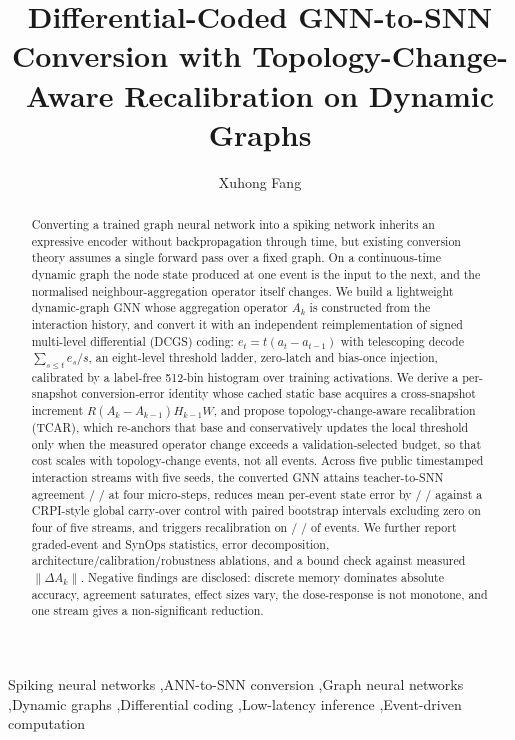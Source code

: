 \documentclass[preprint,12pt]{elsarticle}
\begin{document}
\begin{frontmatter}

\title{Differential-Coded GNN-to-SNN Conversion with Topology-Change-Aware Recalibration on Dynamic Graphs}

\author{Xuhong Fang}
\address{Dongguan City College, Dongguan, Guangdong, China}

\begin{abstract}
Converting a trained graph neural network into a spiking network inherits an expressive encoder without backpropagation through time, but existing conversion theory assumes a single forward pass over a fixed graph. On a continuous-time dynamic graph the node state produced at one event is the input to the next, and the normalised neighbour-aggregation operator itself changes. We build a lightweight dynamic-graph GNN whose aggregation operator $A_k$ is constructed from the interaction history, and convert it with an independent reimplementation of signed multi-level differential (DCGS) coding: $e_t=t(a_t-a_{t-1})$ with telescoping decode $\sum_{s\le t}e_s/s$, an eight-level threshold ladder, zero-latch and bias-once injection, calibrated by a label-free 512-bin histogram over training activations. We derive a per-snapshot conversion-error identity whose cached static base acquires a cross-snapshot increment $R(A_k-A_{k-1})H_{k-1}W$, and propose topology-change-aware recalibration (TCAR), which re-anchors that base and conservatively updates the local threshold only when the measured operator change exceeds a validation-selected budget, so that cost scales with topology-change events, not all events. Across five public timestamped interaction streams with five seeds, the converted GNN attains teacher-to-SNN agreement \AgreeWiki{} / \AgreeMooc{} / \AgreeEnron{} at four micro-steps, reduces mean per-event state error by \RedWiki{} / \RedMooc{} / \RedEnron{} against a CRPI-style global carry-over control with paired bootstrap intervals excluding zero on four of five streams, and triggers recalibration on \TrigWiki{} / \TrigMooc{} / \TrigEnron{} of events. We further report graded-event and SynOps statistics, error decomposition, architecture/calibration/robustness ablations, and a bound check against measured $\|\Delta A_k\|$. Negative findings are disclosed: discrete memory dominates absolute accuracy, agreement saturates, effect sizes vary, the dose-response is not monotone, and one stream gives a non-significant reduction.
\end{abstract}

\begin{keyword}
Spiking neural networks \sep ANN-to-SNN conversion \sep Graph neural networks \sep Dynamic graphs \sep Differential coding \sep Low-latency inference \sep Event-driven computation
\end{keyword}

\end{frontmatter}
\end{document}

